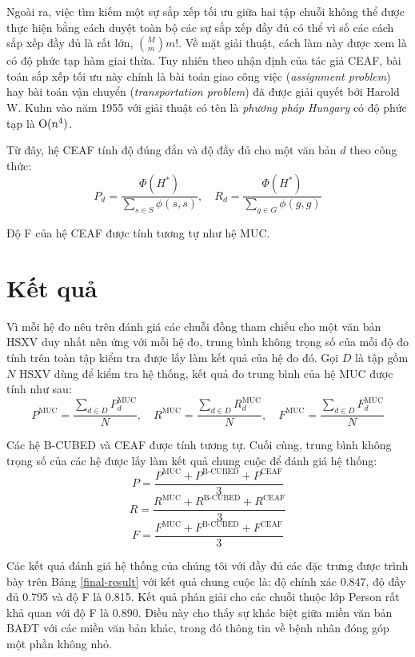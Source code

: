 Ngoài ra, việc tìm kiếm một sự sắp xếp tối ưu giữa hai tập chuỗi không thể được thực hiện bằng cách duyệt toàn bộ các sự sắp xếp đầy đủ có thể vì số các cách sắp xếp đầy đủ là rất lớn, $\binom{M}{m}m!$. Về mặt giải thuật, cách làm này được xem là có độ phức tạp hàm giai thừa. Tuy nhiên theo nhận định của tác giả CEAF, bài toán sắp xếp tối ưu này chính là bài toán giao công việc (\emph{assignment problem}) hay bài toán vận chuyển (\emph{transportation problem}) đã được giải quyết bởi Harold W. Kuhn vào năm 1955 với giải thuật có tên là \emph{phương pháp Hungary} \cite{HungarianMethod} có độ phức tạp là $\operatorname{O}(n^4)$.

Từ đây, hệ CEAF tính độ đúng đắn và độ đầy đủ cho một văn bản $d$ theo công thức:
\[P_d=\frac{\Phi(H^*)}{\sum_{s\in S} \phi(s,s)},\quad R_d=\frac{\Phi(H^*)}{\sum_{g\in G} \phi(g,g)}\]

Độ F của hệ CEAF được tính tương tự như hệ MUC.

\section{Kết quả}
Vì mỗi hệ đo nêu trên đánh giá các chuỗi đồng tham chiếu cho một văn bản HSXV duy nhất nên ứng với mỗi hệ đo, trung bình không trọng số của mỗi độ đo tính trên toàn tập kiểm tra được lấy làm kết quả của hệ đo đó. Gọi $D$ là tập gồm $N$ HSXV dùng để kiểm tra hệ thống, kết quả đo trung bình của hệ MUC được tính như sau:
\[P^{\text{MUC}}=\frac{\sum_{d\in D}P_d^{\text{MUC}}}{N},\quad R^{\text{MUC}}=\frac{\sum_{d\in D}R_d^{\text{MUC}}}{N},\quad F^{\text{MUC}}=\frac{\sum_{d\in D}F_d^{\text{MUC}}}{N}\]

Các hệ B-CUBED và CEAF được tính tương tự. Cuối cùng, trung bình không trọng số của các hệ được lấy làm kết quả chung cuộc để đánh giá hệ thống:
\[P=\frac{P^{\text{MUC}}+P^{\text{B-CUBED}}+P^{\text{CEAF}}}{3}\]
\[R=\frac{R^{\text{MUC}}+R^{\text{B-CUBED}}+R^{\text{CEAF}}}{3}\]
\[F=\frac{F^{\text{MUC}}+F^{\text{B-CUBED}}+F^{\text{CEAF}}}{3}\]

Các kết quả đánh giá hệ thống của chúng tôi với đầy đủ các đặc trưng được trình bày trên Bảng \ref{final-result} với kết quả chung cuộc là: độ chính xác 0.847, độ đầy đủ 0.795 và độ F là 0.815. Kết quả phân giải cho các chuỗi thuộc lớp Person rất khả quan với độ F là 0.890. Điều này cho thấy sự khác biệt giữa miền văn bản BAĐT với các miền văn bản khác, trong đó thông tin về bệnh nhân đóng góp một phần không nhỏ.

